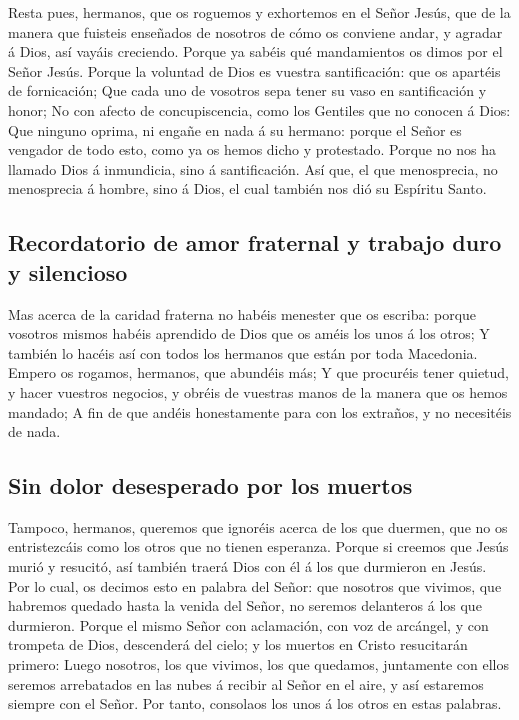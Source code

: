  Resta pues, hermanos, que os roguemos y exhortemos en el
Señor Jesús, que de la manera que fuisteis enseñados de nosotros de cómo
os conviene andar, y agradar á Dios, así vayáis creciendo. 
Porque ya sabéis qué mandamientos os dimos por el Señor Jesús.
 Porque la voluntad de Dios es vuestra santificación: que os
apartéis de fornicación;  Que cada uno de vosotros sepa
tener su vaso en santificación y honor;  No con afecto de
concupiscencia, como los Gentiles que no conocen á Dios: 
Que ninguno oprima, ni engañe en nada á su hermano: porque el Señor es
vengador de todo esto, como ya os hemos dicho y protestado. 
Porque no nos ha llamado Dios á inmundicia, sino á santificación.
 Así que, el que menosprecia, no menosprecia á hombre, sino
á Dios, el cual también nos dió su Espíritu Santo.

\hypertarget{recordatorio-de-amor-fraternal-y-trabajo-duro-y-silencioso}{%
\subsection{Recordatorio de amor fraternal y trabajo duro y
silencioso}\label{recordatorio-de-amor-fraternal-y-trabajo-duro-y-silencioso}}

 Mas acerca de la caridad fraterna no habéis menester que os
escriba: porque vosotros mismos habéis aprendido de Dios que os améis
los unos á los otros;  Y también lo hacéis así con todos
los hermanos que están por toda Macedonia. Empero os rogamos, hermanos,
que abundéis más;  Y que procuréis tener quietud, y hacer
vuestros negocios, y obréis de vuestras manos de la manera que os hemos
mandado;  A fin de que andéis honestamente para con los
extraños, y no necesitéis de nada.

\hypertarget{sin-dolor-desesperado-por-los-muertos}{%
\subsection{Sin dolor desesperado por los
muertos}\label{sin-dolor-desesperado-por-los-muertos}}

 Tampoco, hermanos, queremos que ignoréis acerca de los que
duermen, que no os entristezcáis como los otros que no tienen esperanza.
 Porque si creemos que Jesús murió y resucitó, así también
traerá Dios con él á los que durmieron en Jesús.  Por lo
cual, os decimos esto en palabra del Señor: que nosotros que vivimos,
que habremos quedado hasta la venida del Señor, no seremos delanteros á
los que durmieron.  Porque el mismo Señor con aclamación,
con voz de arcángel, y con trompeta de Dios, descenderá del cielo; y los
muertos en Cristo resucitarán primero:  Luego nosotros, los
que vivimos, los que quedamos, juntamente con ellos seremos arrebatados
en las nubes á recibir al Señor en el aire, y así estaremos siempre con
el Señor.  Por tanto, consolaos los unos á los otros en
estas palabras.

